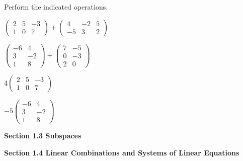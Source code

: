 \documentclass[11pt,largemargins]{homework}
\begin{document}
\question
Perform the indicated operations.
\begin{alphaparts}
    \questionpart
        $\begin{pmatrix}
            2 & 5 & -3 \\
            1 & 0 & 7 
        \end{pmatrix}
        +
        \begin{pmatrix}
            4 & -2 & 5 \\
            -5 & 3 & 2 
        \end{pmatrix}$

    \questionpart
        $\begin{pmatrix}
            -6 & 4  \\
            3 & -2  \\ 
            1 & 8
        \end{pmatrix}
        +
        \begin{pmatrix}
            7 & -5  \\
            0 & -3  \\
            2 & 0
        \end{pmatrix}$

    \questionpart
        $4 
        \begin{pmatrix}
            2 & 5 & -3 \\
            1 & 0 & 7 
        \end{pmatrix}$

    \questionpart
        $-5
        \begin{pmatrix}
            -6 & 4  \\
            3 & -2  \\
            1 & 8
        \end{pmatrix}$

\end{alphaparts}

\question


\textbf{\large{Section 1.3} Subspaces}
\setcounter{questionCounter}{0}
\question

\question

\question

\question

\question


\hfill 

\textbf{\large{Section 1.4} Linear Combinations and Systems of Linear Equations}
\setcounter{questionCounter}{0}
\question
\end{document}
